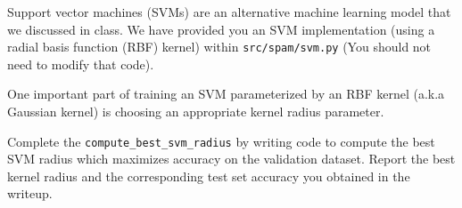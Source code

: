\item {}
Support vector machines (SVMs) are an alternative machine learning model that we discussed in class.
We have provided you an SVM implementation (using a radial basis function (RBF) kernel) within \texttt{src/spam/svm.py} (You should not need to modify that code).

One important part of training an SVM parameterized by an RBF kernel (a.k.a Gaussian kernel) is choosing an appropriate kernel radius parameter.

Complete the \texttt{compute\_best\_svm\_radius} by writing code to compute the best SVM radius which maximizes accuracy on the validation dataset. Report the best kernel radius and the corresponding test set accuracy you obtained in the writeup.

